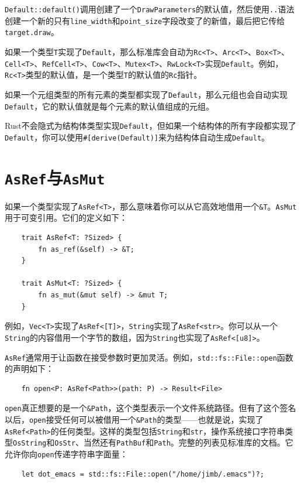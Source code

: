 \texttt{Default::default()}调用创建了一个\texttt{DrawParameters}的默认值，然后使用\texttt{..}语法创建一个新的只有\texttt{line\_width}和\texttt{point\_size}字段改变了的新值，最后把它传给\texttt{target.draw}。

如果一个类型\texttt{T}实现了\texttt{Default}，那么标准库会自动为\texttt{Rc<T>}、\texttt{Arc<T>}、\texttt{Box<T>}、\texttt{Cell<T>}、\texttt{RefCell<T>}、\texttt{Cow<T>}、\texttt{Mutex<T>}、\texttt{RwLock<T>}实现\texttt{Default}。例如，\texttt{Rc<T>}类型的默认值，是一个类型\texttt{T}的默认值的\texttt{Rc}指针。

如果一个元组类型的所有元素的类型都实现了\texttt{Default}，那么元组也会自动实现\texttt{Default}，它的默认值就是每个元素的默认值组成的元组。

Rust不会隐式为结构体类型实现\texttt{Default}，但如果一个结构体的所有字段都实现了\texttt{Default}，你可以使用\texttt{\#[derive(Default)]}来为结构体自动生成\texttt{Default}。

\section{\texttt{AsRef}与\texttt{AsMut}}\label{asref}

如果一个类型实现了\texttt{AsRef<T>}，那么意味着你可以从它高效地借用一个\texttt{\&T}。\texttt{AsMut}用于可变引用。它们的定义如下：
\begin{verbatim}
    trait AsRef<T: ?Sized> {
        fn as_ref(&self) -> &T;
    }

    trait AsMut<T: ?Sized> {
        fn as_mut(&mut self) -> &mut T;
    }
\end{verbatim}

例如，\texttt{Vec<T>}实现了\texttt{AsRef<[T]>}，\texttt{String}实现了\texttt{AsRef<str>}。你可以从一个\texttt{String}的内容借用一个字节的数组，因为\texttt{String}也实现了\texttt{AsRef<[u8]>}。

\texttt{AsRef}通常用于让函数在接受参数时更加灵活。例如，\texttt{std::fs::File::open}函数的声明如下：
\begin{verbatim}
    fn open<P: AsRef<Path>>(path: P) -> Result<File>
\end{verbatim}

\texttt{open}真正想要的是一个\texttt{\&Path}，这个类型表示一个文件系统路径。但有了这个签名以后，\texttt{open}接受任何可以被借用一个\texttt{\&Path}的类型——也就是说，实现了\texttt{AsRef<Path>}的任何类型。这样的类型包括\texttt{String}和\texttt{str}，操作系统接口字符串类型\texttt{OsString}和\texttt{OsStr}、当然还有\texttt{PathBuf}和\texttt{Path}。完整的列表见标准库的文档。它允许你向\texttt{open}传递字符串字面量：
\begin{verbatim}
    let dot_emacs = std::fs::File::open("/home/jimb/.emacs")?;
\end{verbatim}

